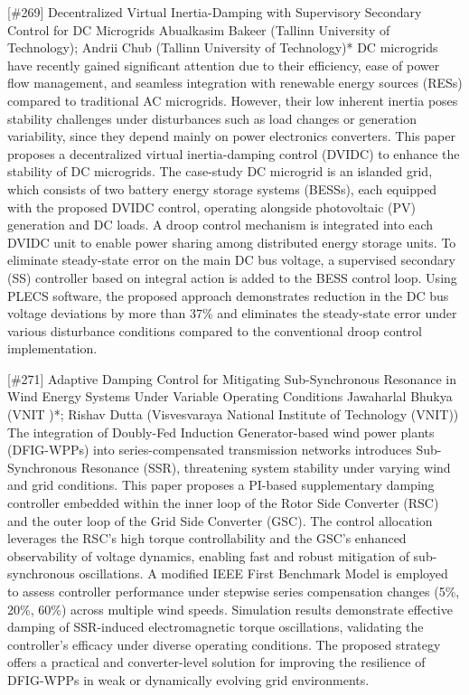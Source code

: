 {} \begin{abstract_online} {[\#269] Decentralized Virtual Inertia-Damping with Supervisory Secondary Control for DC Microgrids} {} {Abualkasim Bakeer (Tallinn University of Technology); Andrii Chub (Tallinn University of Technology)*} {} DC microgrids have recently gained significant attention due to their efficiency, ease of power flow management, and seamless integration with renewable energy sources (RESs) compared to traditional AC microgrids. However, their low inherent inertia poses stability challenges under disturbances such as load changes or generation variability, since they depend mainly on power electronics converters. This paper proposes a decentralized virtual inertia-damping control (DVIDC) to enhance the stability of DC microgrids. The case-study DC microgrid is an islanded grid, which consists of two battery energy storage systems (BESSs), each equipped with the proposed DVIDC control, operating alongside photovoltaic (PV) generation and DC loads. A droop control mechanism is integrated into each DVIDC unit to enable power sharing among distributed energy storage units. To eliminate steady-state error on the main DC bus voltage, a supervised secondary (SS) controller based on integral action is added to the BESS control loop. Using PLECS software, the proposed approach demonstrates reduction in the DC bus voltage deviations by more than 37\% and eliminates the steady-state error under various disturbance conditions compared to the conventional droop control implementation. \end{abstract_online} 
{} \begin{abstract_online} {[\#271] Adaptive Damping Control for Mitigating Sub-Synchronous Resonance in Wind Energy Systems Under Variable Operating Conditions} {} {Jawaharlal Bhukya (VNIT )*; Rishav Dutta  (Visvesvaraya National Institute of Technology (VNIT))} {} The integration of Doubly-Fed Induction Generator-based wind power plants (DFIG-WPPs) into series-compensated transmission networks introduces Sub-Synchronous Resonance (SSR), threatening system stability under varying wind and grid conditions. This paper proposes a PI-based supplementary damping controller embedded within the inner loop of the Rotor Side Converter (RSC) and the outer loop of the Grid Side Converter (GSC). The control allocation leverages the RSC's high torque controllability and the GSC's enhanced observability of voltage dynamics, enabling fast and robust mitigation of sub-synchronous oscillations. A modified IEEE First Benchmark Model is employed to assess controller performance under stepwise series compensation changes (5\%, 20\%, 60\%) across multiple wind speeds. Simulation results demonstrate effective damping of SSR-induced electromagnetic torque oscillations, validating the controller's efficacy under diverse operating conditions. The proposed strategy offers a practical and converter-level solution for improving the resilience of DFIG-WPPs in weak or dynamically evolving grid environments. \end{abstract_online} 
